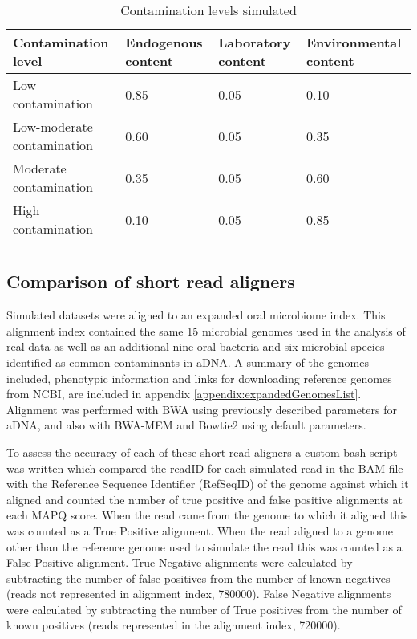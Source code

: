 \documentclass[12pt, a4paper]{article}
\renewcommand{\arraystretch}{1.2}
\newcommand{\ra}[1]{\renewcommand{\arraystretch}{#1}}
\begin{document}
\setlength{\intextsep}{5pt plus 1.0pt minus 2.0pt}
\begin{table*}[h]\centering\small %
\ra{1.3}
\setlength{\tabcolsep}{8pt} %
\caption{Contamination levels simulated}\label{table:simulatedContaminationLevels}
\begin{tabular}{@{}C{5cm} C{3cm} C{3cm} C{3cm}@{}}
	\toprule
	{\textbf{Contamination level}} & {\textbf{Endogenous content}} & {\textbf{Laboratory content}} & {\textbf{Environmental content}} \\
	\midrule
	Low contamination & 0.85 & 0.05 & 0.10 \\ 
 	Low-moderate contamination & 0.60 & 0.05 & 0.35 \\ 
	Moderate contamination & 0.35 & 0.05 & 0.60 \\ 
	High contamination & 0.10 & 0.05 & 0.85 \\ 
\bottomrule\\
\end{tabular}
\end{table*}

\subsection{Comparison of short read aligners}

Simulated datasets were aligned to an expanded oral microbiome index. 
This alignment index contained the same 15 microbial genomes used in the analysis of real data as well as an additional nine oral bacteria %
and six microbial species identified as common contaminants in aDNA. 
A summary of the genomes included, phenotypic information and links for downloading reference genomes from NCBI, are included in appendix \ref{appendix:expandedGenomesList}.
Alignment was performed with BWA using previously described parameters for aDNA, and also with BWA-MEM \cite{Li:2013} and Bowtie2 \cite{Langmead:2012aa} using default parameters.
 
To assess the accuracy of each of these short read aligners a custom bash script was written which compared the readID for each simulated read in the BAM file with the Reference Sequence Identifier (RefSeqID) of the genome against which it aligned and counted the number of true positive and false positive alignments at each MAPQ score.
When the read came from the genome to which it aligned this was counted as a True Positive alignment.
When the read aligned to a genome other than the reference genome used to simulate the read this was counted as a False Positive alignment. 
True Negative alignments were calculated by subtracting the number of false positives from the number of known negatives (reads not represented in alignment index, 780000).
False Negative alignments were calculated by subtracting the number of True positives from the number of known positives (reads represented in the alignment index, 720000).\\
\end{document}
